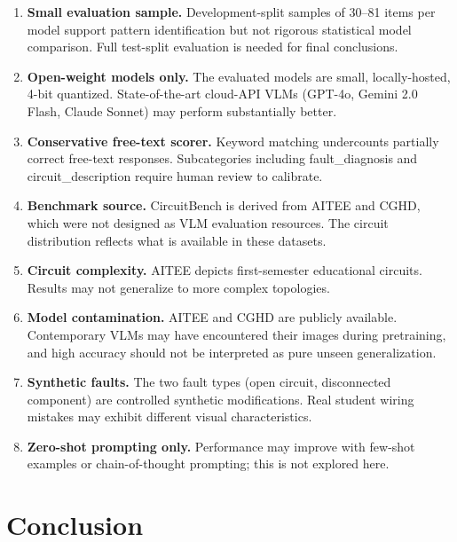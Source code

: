 \documentclass[conference]{IEEEtran}
\begin{document}
\begin{enumerate}

\item \textbf{Small evaluation sample.}
Development-split samples of 30--81 items per model support pattern
identification but not rigorous statistical model comparison.
Full test-split evaluation is needed for final conclusions.

\item \textbf{Open-weight models only.}
The evaluated models are small, locally-hosted, 4-bit quantized.
State-of-the-art cloud-API VLMs (GPT-4o, Gemini 2.0 Flash,
Claude Sonnet) may perform substantially better.

\item \textbf{Conservative free-text scorer.}
Keyword matching undercounts partially correct free-text responses.
Subcategories including fault\_diagnosis and circuit\_description
require human review to calibrate.

\item \textbf{Benchmark source.}
CircuitBench is derived from AITEE and CGHD, which were not designed
as VLM evaluation resources.
The circuit distribution reflects what is available in these datasets.

\item \textbf{Circuit complexity.}
AITEE depicts first-semester educational circuits.
Results may not generalize to more complex topologies.

\item \textbf{Model contamination.}
AITEE and CGHD are publicly available.
Contemporary VLMs may have encountered their images during pretraining,
and high accuracy should not be interpreted as pure unseen
generalization.

\item \textbf{Synthetic faults.}
The two fault types (open circuit, disconnected component) are
controlled synthetic modifications.
Real student wiring mistakes may exhibit different visual
characteristics.

\item \textbf{Zero-shot prompting only.}
Performance may improve with few-shot examples or chain-of-thought
prompting; this is not explored here.

\end{enumerate}


\section{Conclusion}
\label{sec:conclusion}
\end{document}
